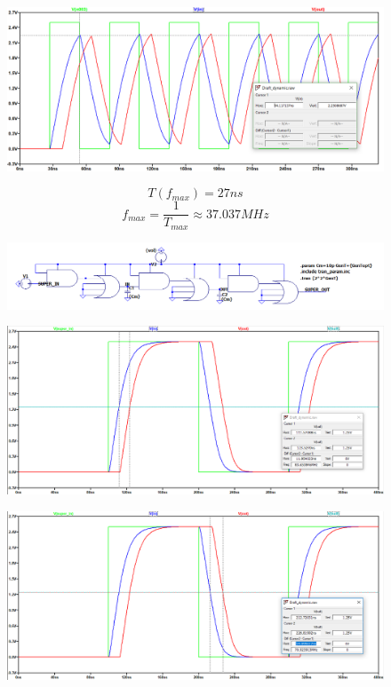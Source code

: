 \documentclass[a4paper,14pt]{article}
\begin{document}
\begin{figure}[H]
	\centering
	\includegraphics[width=\linewidth]{image/dyn_max_volt}
	\caption{}
	\label{fig:dyn_max_volt}
\end{figure}

$$T(f_{max}) = 27ns$$
$$f_{max} = \dfrac{1}{T_{max}} \approx 37.037 MHz$$

\begin{figure}[H]
	\centering
	\includegraphics[width=0.7\linewidth]{image/dyn_shema_opt}
	\caption{}
	\label{fig:dynshemamin}
\end{figure}

\begin{figure}[H]
	\centering
	\includegraphics[width=\linewidth]{image/dyn_opt_zad01}
	\caption{}
	\label{fig:dynoptzad01}
\end{figure}


\begin{figure}[H]
	\centering
	\includegraphics[width=\linewidth]{image/dyn_opt_zad10}
	\caption{}
	\label{fig:dynoptzad10}
\end{figure}
\end{document}
